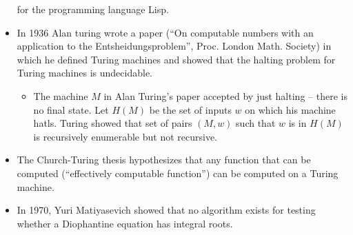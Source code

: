 \documentclass[]{article}
\begin{document}
\begin{itemize}
    for the programming language Lisp.
    \item In 1936 Alan turing wrote a paper (``On computable numbers with an 
    application to the Entsheidungsproblem'', Proc. London Math. Society) in 
    which he defined Turing machines and showed that the halting problem for 
    Turing machines is undecidable.
      \begin{itemize}
        \item The machine $M$ in Alan Turing's paper accepted by just halting 
        -- there is no final state. Let $H(M)$ be the set of inputs $w$ on 
        which his machine hatls. Turing showed that set of pairs $(M, w)$ such 
        that $w$ is in $H(M)$ is recursively enumerable but not recursive.
      \end{itemize}
    \item The Church-Turing thesis hypothesizes that any function that can be 
    computed (``effectively computable function'') can be computed on a Turing 
    machine.
    \item In 1970, Yuri Matiyasevich showed that no algorithm exists for 
    testing whether a Diophantine equation has integral roots.
  \end{itemize}
\end{document}
